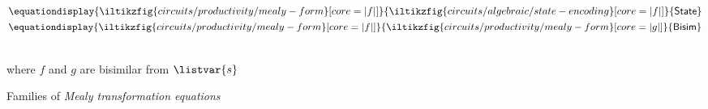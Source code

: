 \documentclass[10pt]{article}
\begin{document}
\begin{figure}
    \centering
    \(\equationdisplay{
        \iltikzfig{circuits/productivity/mealy-form}[core=|f|]
    }{
        \iltikzfig{circuits/algebraic/state-encoding}[core=|f|]
    }{\mathsf{State}}\)
    \qquad
    \(\equationdisplay{
        \iltikzfig{circuits/productivity/mealy-form}[core=|f|]
    }{
        \iltikzfig{circuits/productivity/mealy-form}[core=|g|]
    }{\mathsf{Bisim}}\)
    \,\,
    \begin{minipage}{0.15\textwidth}
        \centering
        where \(f\) and \(g\) are bisimilar from \(\listvar{s}\)
    \end{minipage}
    \caption{Families of \emph{Mealy transformation equations}}
    \label{fig:mealy-transformation-equations}
\end{figure}

\printbibliography[heading=bibintoc,title={References}]
\end{document}
